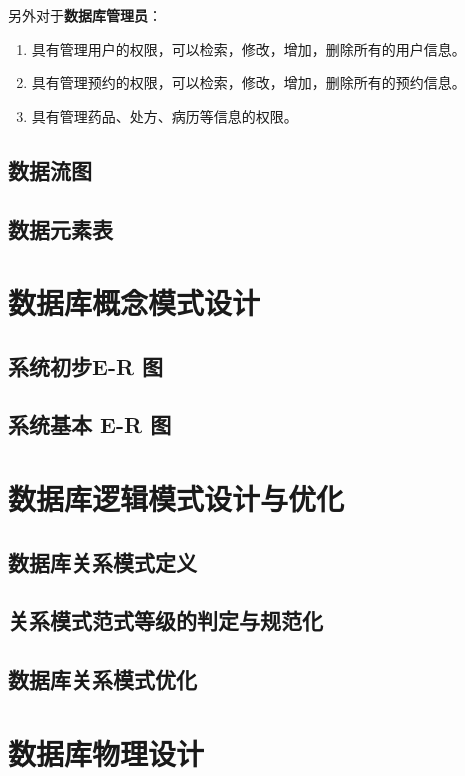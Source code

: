 \documentclass{article}
\begin{document}
\vspace{0.5cm}
另外对于\textbf{数据库管理员}：
\begin{enumerate}[itemsep=0.01em]
    \item 具有管理用户的权限，可以检索，修改，增加，删除所有的用户信息。
    \item 具有管理预约的权限，可以检索，修改，增加，删除所有的预约信息。
    \item 具有管理药品、处方、病历等信息的权限。
\end{enumerate}

\subsection{数据流图}

\subsection{数据元素表}


\section{数据库概念模式设计}
\subsection{系统初步E-R 图}

\subsection{系统基本 E-R 图}

\section{数据库逻辑模式设计与优化}
\subsection{数据库关系模式定义}

\subsection{关系模式范式等级的判定与规范化}

\subsection{数据库关系模式优化}

\section{数据库物理设计}
\end{document}
